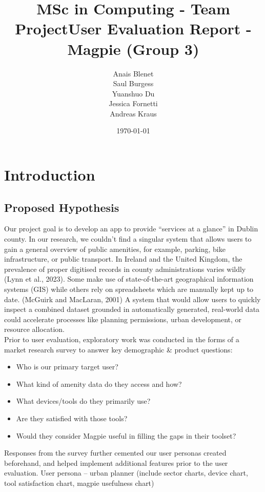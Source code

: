 \documentclass{report}
\begin{document}
\title{MSc in Computing - Team Project}
\title{User Evaluation Report - Magpie (Group 3)}
\author{Anais Blenet\\Saul Burgess\\Yuanshuo Du\\Jessica Fornetti\\Andreas Kraus}
\date{\today}

\renewcommand{\cfttoctitlefont}{\hfill\Huge\bfseries} %
\renewcommand{\cftaftertoctitle}{\hfill}

\maketitle %

\tableofcontents
\newpage

\chapter{Introduction}
\section{Proposed Hypothesis}
Our project goal is to develop an app to provide “services at a glance” in Dublin county. In our research, we couldn’t find a singular system that allows users to gain a general overview of public amenities, for example, parking, bike infrastructure, or public transport. In Ireland and the United Kingdom, the prevalence of proper digitised records in county administrations varies wildly (Lynn et al., 2023). Some make use of state-of-the-art geographical information systems (GIS) while others rely on spreadsheets which are manually kept up to date. (McGuirk and MacLaran, 2001) A system that would allow users to quickly inspect a combined dataset grounded in automatically generated, real-world data could accelerate processes like planning permissions, urban development, or resource allocation.\\
Prior to user evaluation, exploratory work was conducted in the forms of a market research survey to answer key demographic \& product questions:
\begin{itemize}
    \item Who is our primary target user?
    \item What kind of amenity data do they access and how?
    \item What devices/tools do they primarily use?
    \item Are they satisfied with those tools?
    \item Would they consider Magpie useful in filling the gaps in their toolset?
\end{itemize}
Responses from the survey further cemented our user personas created beforehand, and helped implement additional features prior to the user evaluation.
User persona – urban planner (include sector charts, device chart, tool satisfaction chart, magpie usefulness chart)
\end{document}
